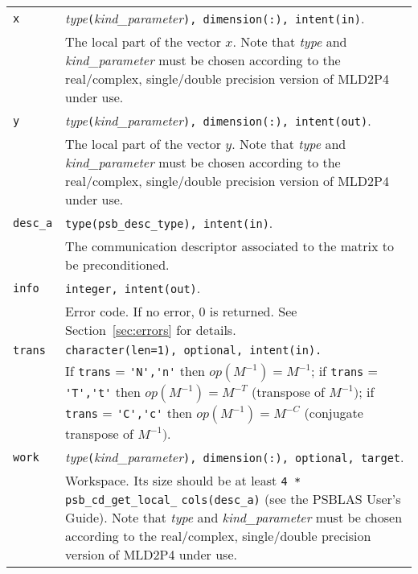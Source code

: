 \begin{tabular}{p{1.2cm}p{12cm}}
\verb|x|      & \emph{type}\verb|(|\emph{kind\_parameter}\verb|), dimension(:), intent(in)|.\\
              & The local part of the vector $x$. Note that \emph{type} and   
                \emph{kind\_parameter} must be chosen according
                to the real/complex, single/double precision version of MLD2P4 under use.\\
\verb|y|      & \emph{type}\verb|(|\emph{kind\_parameter}\verb|), dimension(:), intent(out)|.\\
              & The local part of the vector $y$. Note that \emph{type} and
                \emph{kind\_parameter} must be chosen according
                to the real/complex, single/double precision version of MLD2P4 under use.\\
\verb|desc_a| & \verb|type(psb_desc_type), intent(in)|. \\
              & The communication descriptor associated to the matrix to be
                preconditioned.\\
\verb|info|   & \verb|integer, intent(out)|.\\
              & Error code. If no error, 0 is returned. See Section~\ref{sec:errors} for details.\\
\verb|trans|  & \verb|character(len=1), optional, intent(in).|\\
              & If \verb|trans| = \verb|'N','n'| then $op(M^{-1}) = M^{-1}$;
                if \verb|trans| = \verb|'T','t'| then $op(M^{-1}) = M^{-T}$
                (transpose of $M^{-1})$;  if \verb|trans| = \verb|'C','c'| then $op(M^{-1}) = M^{-C}$
                (conjugate transpose of $M^{-1})$.\\
\verb|work|  & \emph{type}\verb|(|\emph{kind\_parameter}\verb|), dimension(:), optional, target|.\\
             & Workspace. Its size should be at
               least \verb|4 * psb_cd_get_local_| \verb|cols(desc_a)| (see the PSBLAS User's Guide).
               Note that \emph{type} and \emph{kind\_parameter} must be chosen according
               to the real/complex, single/double precision version of MLD2P4 under use.\\
\end{tabular}

